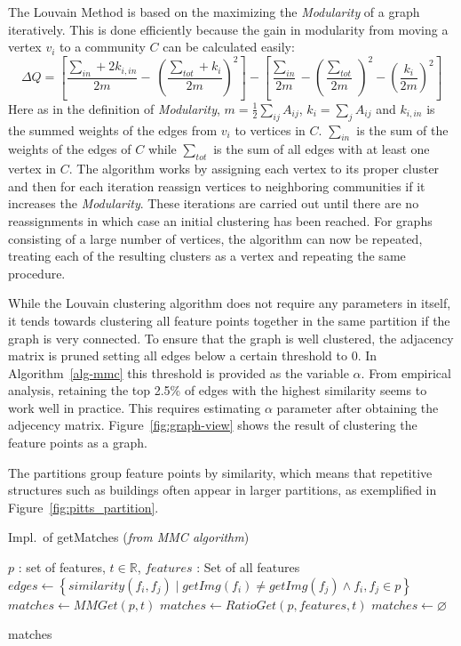 The Louvain Method is based on the maximizing the \emph{Modularity} of a 
graph iteratively. This is done efficiently because the gain in 
modularity from moving a vertex $v_i$ to a community $C$ can be 
calculated easily:
\begin{equation*}
	\Delta Q = \left[ \frac{\sum_{in} + 2 k_{i,in}}{2m} - \
    \left(\frac{\sum_{tot} + k_i}{2m} \right)^2 \right]
	- \left[\frac{\sum_{in}}{2m} - \left(\frac{\sum_{tot}}{2m} \
	\right)^2 - \left( \frac{k_i}{2m} \right)^2 \right]
\end{equation*}
Here as in the definition of \emph{Modularity}, $m=\frac{1}{2} \sum_{ij} 
A_{ij}$, $k_i = \sum_j A_{ij}$ and $k_{i,in}$ is the summed weights of 
the edges from $v_i$ to vertices in $C$.  $\sum_{in}$ is the sum of the 
weights of the edges of $C$ while $\sum_{tot}$ is the sum of all edges 
with at least one vertex in $C$.  The algorithm works by assigning each 
vertex to its proper cluster and then for each iteration reassign 
vertices to neighboring communities if it increases the 
\emph{Modularity}.  These iterations are carried out until there are no 
reassignments in which case an initial clustering has been reached.  For 
graphs consisting of a large number of vertices, the algorithm can now 
be repeated, treating each of the resulting clusters as a vertex and 
repeating the same procedure.

While the Louvain clustering algorithm does not require any parameters 
in itself, it tends towards clustering all feature points together in 
the same partition if the graph is very connected.  To ensure that the 
graph is well clustered, the adjacency matrix is pruned setting all 
edges below a certain threshold to $0$. In Algorithm~\ref{alg-mmc} this 
threshold is provided as the variable $\alpha$.  From empirical 
analysis, retaining the top 2.5\% of edges with the highest similarity 
seems to work well in practice. This requires estimating $\alpha$ 
parameter after obtaining the adjecency matrix.  
Figure~\ref{fig:graph-view} shows the result of clustering the feature 
points as a graph.

The partitions group feature points by similarity, which means that 
repetitive structures such as buildings often appear in larger 
partitions, as exemplified in Figure~\ref{fig:pitts_partition}.

\begin{algorithm}[t]
\caption{Impl.\ of getMatches (\emph{from MMC algorithm})}
\label{alg-getmatches}
    \begin{algorithmic}
    \Require $p$ : set of features, $t\in \mathbb{R}$, $features$ : Set of 
    all features
    \State $edges \gets \left\{similarity(f_i, f_j) \mid getImg(f_i)
        \neq getImg(f_j) \wedge f_i, f_j \in p \right\}$
    \If{$\left\vert edges \right\vert > 1$}
        \State $matches \gets MMGet(p, t)$
        \State $matches \gets RatioGet(p, features, t)$
    \Else
        \State $matches \gets \varnothing$
    \EndIf

    \Return matches
    \end{algorithmic}
\end{algorithm}

